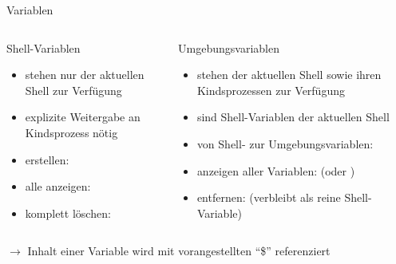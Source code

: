 \documentclass[aspectratio=43]{beamer}
\begin{document}
\begin{frame}{Variablen}
  \begin{columns}
    \begin{column}{0.435\textwidth}
      \begin{block}{Shell-Variablen}
        \begin{itemize}
          \item stehen nur der aktuellen Shell zur Verfügung
          \item explizite Weitergabe an Kindsprozess nötig
          \item erstellen: 
          \item alle anzeigen: 
          \item komplett löschen: 
        \end{itemize}
      \end{block}
    \end{column}
    \begin{column}{0.65\textwidth}
       \begin{block}{Umgebungsvariablen}
            \begin{itemize}
              \item stehen der aktuellen Shell sowie ihren Kindsprozessen zur Verfügung
              \item sind Shell-Variablen der aktuellen Shell
              \item von Shell- zur Umgebungsvariablen: 
              \item anzeigen aller Variablen:  (oder )
              \item entfernen:  (verbleibt als reine Shell-Variable)
            \end{itemize}
        \end{block}
    \end{column}
  \end{columns}
  $\rightarrow$ Inhalt einer Variable wird mit vorangestellten "`\$"' referenziert
\end{frame}
    
\end{document}
